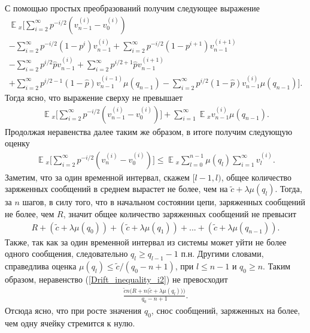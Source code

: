 \documentclass[10pt, reqno]{amsart}
\DeclareMathOperator*{\E}{\mathbb{E}}
\begin{document}
С помощью простых преобразований получим следующее выражение
\begin{align*}
    \E{}_{x}\Big[\sum_{i=2}^{\infty}p^{-i/2}(v_{n-1}^{(i)} - v_{0}^{(i)}) \\- \sum_{i=2}^{\infty}p^{-i/2}(1 - p^{i})v_{n-1}^{(i)} + \sum_{i=2}^{\infty}p^{-i/2}(1 - p^{i+1})v_{n-1}^{(i+1)} \\- \sum_{i=2}^{\infty}p^{i/2}\hat{p}v_{n-1}^{(i)} + \sum_{i=2}^{\infty}p^{i/2+1}\hat{p}v_{n-1}^{(i+1)} \\+ \sum_{i=2}^{\infty}p^{i/2-1}(1-\hat{p})v_{n-1}^{(i-1)}\mu(q_{n-1}) - \sum_{i=2}^{\infty}p^{i/2}(1-\hat{p})v_{n-1}^{(i)}\mu(q_{n-1})\Big].
\end{align*}
Тогда ясно, что выражение сверху не превышает
\begin{align*}
    \E{}_{x}\Big[\sum_{i=2}^{\infty}p^{-i/2}(v_{n-1}^{(i)} - v_{0}^{(i)})\Big] + \sum_{i=1}^{\infty}\E{}_{x}v_{n-1}^{(i)}\mu(q_{n-1}).
\end{align*}
Продолжая неравенства далее таким же образом, в итоге получим следующую оценку
\begin{align}
    \E{}_{x}\Big[\sum_{i=2}^{\infty}p^{-i/2}(v_{n}^{(i)} - v_{0}^{(i)})\Big] \leq \E{}_{x}\sum_{l=0}^{n-1}\mu(q_{l})\sum_{i=1}^{\infty}v_{l}^{(i)}.
    \label{Drift_inequality_i2}
\end{align}
Заметим, что за один временной интервал, скажем $[l-1, l)$, общее количество заряженных сообщений в среднем вырастет не более, чем на $\widetilde{c} + \lambda\mu(q_{l})$. Тогда, за $n$ шагов, в силу того, что в начальном состоянии цепи, заряженных сообщений не более, чем $R$, значит общее количество заряженных сообщений не превысит
\begin{align*}
    R + (\widetilde{c} + \lambda\mu(q_{0})) + (\widetilde{c} + \lambda\mu(q_{1})) + ... + (\widetilde{c} + \lambda\mu(q_{n-1})).
\end{align*}
Также, так как за один временной интервал из системы может уйти не более одного сообщения, следовательно $q_{l} \geq q_{l-1}-1$ п.н. Другими словами, справедлива оценка $\mu(q_{l}) \leq \widetilde{c}/(q_{0}-n+1)$, при $l \leq n-1$ и $q_{0} \geq n$. Таким образом, неравенство (\ref{Drift_inequality_i2}) не превосходит
\begin{align*}
    \frac{\widetilde{c}n\Big(R + n\big(\widetilde{c} + \lambda\mu(q_{l})\big)\Big)}{q_{0}-n+1}.
\end{align*}
Отсюда ясно, что при росте значения $q_{0}$, снос сообщений, заряженных на более, чем одну ячейку стремится к нулю.
\\
\end{document}
